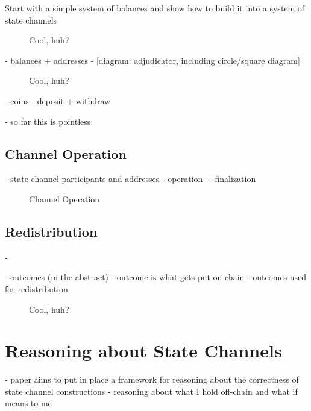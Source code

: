 \documentclass{article}
\begin{document}
Start with a simple system of balances and show how to build it into a system of state channels

\begin{figure}[h]\centering
  \makebox[\textwidth][c]{}
  \caption{Cool, huh?}
\end{figure}

- balances + addresses
- [diagram: adjudicator, including circle/square diagram]

\begin{figure}[h]\centering
  \makebox[\textwidth][c]{}
  \caption{Cool, huh?}
\end{figure}

- coins
- deposit + withdraw 

- so far this is pointless

\subsection{Channel Operation}

- state channel participants and addresses
- operation + finalization

\begin{figure}[h]\centering
  

  \caption{Channel Operation}\label{fig:modes}
\end{figure}

\subsection{Redistribution}

- 

- outcomes (in the abstract) - outcome is what gets put on chain
- outcomes used for redistribution

\begin{figure}[h]\centering
  \makebox[\textwidth][c]{}
  \caption{Cool, huh?}
\end{figure}

\section{Reasoning about State Channels}

- paper aims to put in place a framework for reasoning about the correctness of state channel constructions
- reasoning about what I hold off-chain and what if means to me
\end{document}
